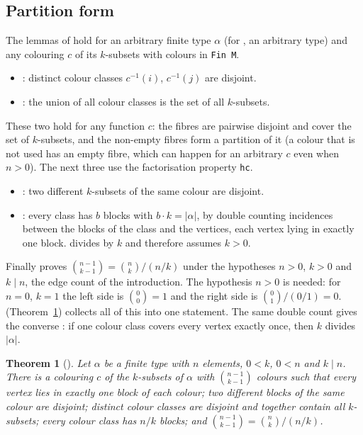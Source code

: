 \documentclass[11pt]{article}
\newtheorem{theorem}{Theorem}
\theoremstyle{definition}
\theoremstyle{remark}
\newcommand{\lean}[1]{\texttt{#1}}
\begin{document}
\subsection{Partition form}\label{sec:partition}
The lemmas of  hold for an arbitrary finite type $\alpha$ (for
, an arbitrary type) and any colouring $c$ of its $k$-subsets with
colours in \lean{Fin M}.
\begin{itemize}
\item {}: distinct colour classes $c^{-1}(i)$, $c^{-1}(j)$ are disjoint.
\item {}: the union of all colour classes is the set of all $k$-subsets.
\end{itemize}
These two hold for any function $c$: the fibres are pairwise disjoint and cover the set of
$k$-subsets, and the non-empty fibres form a partition of it (a colour that is not used has an
empty fibre, which can happen for an arbitrary $c$ even when $n>0$). The next three use the factorisation property \lean{hc}.
\begin{itemize}
\item {}: two different $k$-subsets of the same colour are disjoint.
\item {}: every class has $b$ blocks with $b\cdot k=|\alpha|$, by double
counting incidences between the blocks of the class and the vertices, each vertex lying in
exactly one block.  divides by $k$ and therefore assumes $k>0$.
\end{itemize}
Finally  proves $\binom{n-1}{k-1}=\binom nk/(n/k)$ under the
hypotheses $n>0$, $k>0$ and $k\mid n$, the edge count of the introduction. The hypothesis $n>0$ is
needed: for $n=0$, $k=1$ the left side is $\binom{0}{0}=1$ and the right side is
$\binom01/(0/1)=0$.  (Theorem~\ref{thm:partition}) collects all of this into one statement.
The same double count gives the converse : if one colour
class covers every vertex exactly once, then $k$ divides $|\alpha|$.

\begin{theorem}[]\label{thm:partition}
Let $\alpha$ be a finite type with $n$ elements, $0<k$, $0<n$ and $k\mid n$. There is a colouring
$c$ of the $k$-subsets of $\alpha$ with $\binom{n-1}{k-1}$ colours such that every vertex lies in
exactly one block of each colour; two different blocks of the same colour are disjoint; distinct
colour classes are disjoint and together contain all $k$-subsets; every colour class has $n/k$
blocks; and $\binom{n-1}{k-1}=\binom nk/(n/k)$.
\end{theorem}
\end{document}
